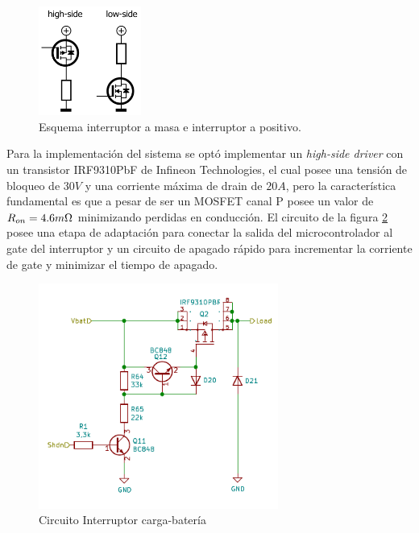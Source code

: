 \documentclass[10pt,a4paper]{article}
\begin{document}

\begin{figure}[h!]
	\begin{center}
		\includegraphics[width=0.30\textwidth]{low_high_driver_sch.png}
		\caption{Esquema interruptor a masa e interruptor a positivo.}
		\label{low_high_driver_sch}
	\end{center}
\end{figure}
\FloatBarrier

Para la implementación del sistema se optó implementar un \emph{high-side
driver} con un transistor IRF9310PbF de Infineon Technologies, el cual posee una
tensión de bloqueo de $30V$ y una corriente máxima de drain de $20A$, pero la
característica fundamental es que a pesar de ser un MOSFET canal P posee un
valor de $R_{on}=4.6 m\ohm$ minimizando perdidas en conducción. El circuito de
la figura \ref{load_sw_sch} posee una etapa de adaptación para conectar la
salida del microcontrolador al gate del interruptor y un circuito de apagado
rápido para incrementar la corriente de gate y minimizar el tiempo de apagado.

\begin{figure}[h!]
	\begin{center}
		\includegraphics[width=0.7\textwidth]{kcd_bat_load_switch.pdf}
		\caption{Circuito Interruptor carga-batería}
		\label{load_sw_sch}
	\end{center}
\end{figure}
\FloatBarrier
\end{document}
